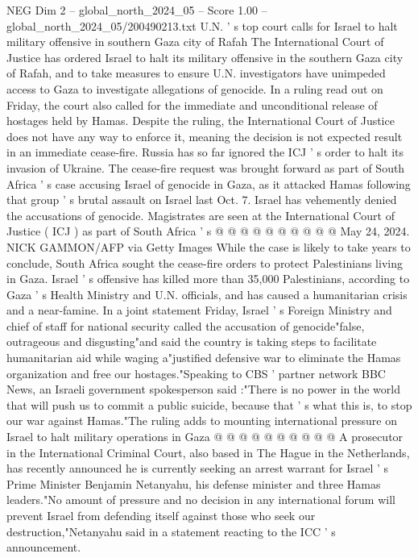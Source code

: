 \begin{textsample}{NEG Dim 2 – global\_north\_2024\_05 – Score 1.00 – global\_north\_2024\_05/200490213.txt}  \label{ex:f2_neg_062}
U.N. ' s top court calls for Israel to halt military offensive in southern Gaza city of Rafah The International Court of Justice has ordered Israel to halt its military offensive in the southern Gaza city of Rafah, and to take measures to ensure U.N. investigators have unimpeded access to Gaza to investigate allegations of genocide.
In a ruling read out on Friday, the court also called for the immediate and unconditional release of hostages held by Hamas.
Despite the ruling, the International Court of Justice does not have any way to enforce it, meaning the decision is not expected result in an immediate cease-fire.
Russia has so far ignored the ICJ ' s order to halt its invasion of Ukraine.
The cease-fire request was brought forward as part of South Africa ' s case accusing Israel of genocide in Gaza, as it attacked Hamas following that group ' s brutal assault on Israel last Oct. 7.
Israel has vehemently denied the accusations of genocide.
Magistrates are seen at the International Court of Justice ( ICJ ) as part of South Africa ' s @ @ @ @ @ @ @ @ @ @ May 24, 2024.
NICK GAMMON/AFP via Getty Images While the case is likely to take years to conclude, South Africa sought the cease-fire orders to protect Palestinians living in Gaza.
Israel ' s offensive has killed more than 35,000 Palestinians, according to Gaza ' s Health Ministry and U.N. officials, and has caused a humanitarian crisis and a near-famine.
In a joint statement Friday, Israel ' s Foreign Ministry and chief of staff for national security called the accusation of genocide"false, outrageous and disgusting"and said the country is taking steps to facilitate humanitarian aid while waging a"justified defensive war to eliminate the Hamas organization and free our hostages."Speaking to CBS ' partner network BBC News, an Israeli government spokesperson said :"There is no power in the world that will push us to commit a public suicide, because that ' s what this is, to stop our war against Hamas."The ruling adds to mounting international pressure on Israel to halt military operations in Gaza @ @ @ @ @ @ @ @ @ @ A prosecutor in the International Criminal Court, also based in The Hague in the Netherlands, has recently announced he is currently seeking an arrest warrant for Israel ' s Prime Minister Benjamin Netanyahu, his defense minister and three Hamas leaders."No amount of pressure and no decision in any international forum will prevent Israel from defending itself against those who seek our destruction,"Netanyahu said in a statement reacting to the ICC ' s announcement.

\end{textsample}
